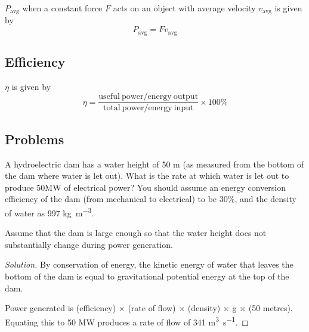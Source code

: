  $P_{\mathrm{avg}}$ when a constant force $F$ acts on an object with average velocity $v_{\mathrm{avg}}$ is given by
\begin{equation} P_{\mathrm{avg}} =  F v_{\mathrm{avg}} \end{equation}

\subsection{Efficiency}
 $\eta$ is given by
\begin{equation} \eta = \frac{\mathrm{useful\:power/energy\:output}}{\mathrm{total\:power/energy\:input}} \times 100\% \end{equation}
\pagebreak

\subsection*{Problems}
\begin{prbm}
A hydroelectric dam has a water height of 50 \unit{m} (as measured from the bottom of the dam where water is let out). What is the rate at which water is let out to produce 50MW of electrical power? You should assume an energy conversion efficiency of the dam (from mechanical to electrical) to be $30\%$, and the density of water as 997 \unit{kg.m^{-3}}.

Assume that the dam is large enough so that the water height does not substantially change during power generation.
\end{prbm}

\begin{proof}[Solution]
By conservation of energy, the kinetic energy of water that leaves the bottom of the dam is equal to gravitational potential energy at the top of the dam.

Power generated is (efficiency) × (rate of flow) × (density) × g × (50 metres). Equating this to 50 MW produces a rate of flow of 341 \unit{m^3.s^{-1}}.
\end{proof}
\pagebreak